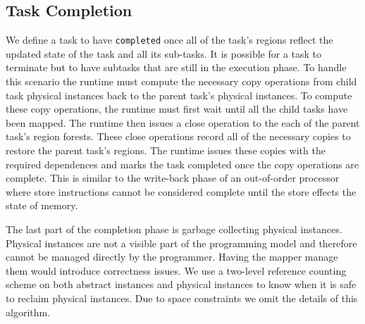 \subsection{Task Completion}
\label{subsec:cleanup}
We define a task to have {\tt completed} once all of the task's regions reflect
the updated state of the task and all its sub-tasks.  
It is possible for a task to terminate but to have subtasks that are still in the execution phase.
To handle this scenario the runtime must compute the necessary copy operations
from child task physical instances back to the parent task's physical instances.  To
compute these copy operations, the runtime must first wait until all the child tasks
have been mapped.  The runtime then issues a close operation to the each of the parent
task's region forests.  These close operations record all of the necessary copies to
restore the parent task's regions.  
The runtime issues these copies with the required dependences
and marks the task completed once the copy operations are complete.
This is similar to the write-back phase of an out-of-order processor where store instructions cannot be
considered complete until the store effects the state of memory.

The last part of the completion phase is garbage collecting physical instances.  Physical
instances are not a visible part of the programming model and therefore cannot be managed
directly by the programmer.  Having the mapper manage them would introduce correctness
issues.  We use a two-level reference counting scheme on both abstract instances and physical
instances to know when it is safe to reclaim physical instances.  Due to space constraints
we omit the details of this algorithm. 


